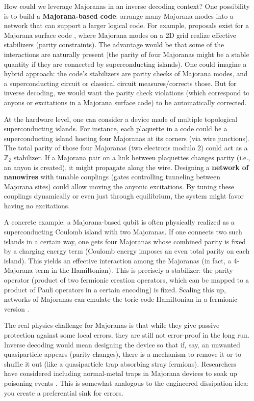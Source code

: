 \documentclass[11pt]{article}
\begin{document}
How could we leverage Majoranas in an inverse decoding context? One possibility is to build a \textbf{Majorana-based code}: arrange many Majorana modes into a network that can support a larger logical code. For example, proposals exist for a Majorana surface code \cite{Terhal2012MajoranaSurf}, where Majorana modes on a 2D grid realize effective stabilizers (parity constraints). The advantage would be that some of the interactions are naturally present (the parity of four Majoranas might be a stable quantity if they are connected by superconducting islands). One could imagine a hybrid approach: the code's stabilizers are parity checks of Majorana modes, and a superconducting circuit or classical circuit measures/corrects those. But for inverse decoding, we would want the parity check violations (which correspond to anyons or excitations in a Majorana surface code) to be automatically corrected.

At the hardware level, one can consider a device made of multiple topological superconducting islands. For instance, each plaquette in a code could be a superconducting island hosting four Majoranas at its corners (via wire junctions). The total parity of those four Majoranas (two electrons modulo 2) could act as a $\mathbb{Z}_2$ stabilizer. If a Majorana pair on a link between plaquettes changes parity (i.e., an anyon is created), it might propagate along the wire. Designing a \textbf{network of nanowires} with tunable couplings (gates controlling tunneling between Majorana sites) could allow moving the anyonic excitations. By tuning these couplings dynamically or even just through equilibrium, the system might favor having no excitations.

A concrete example: a Majorana-based qubit is often physically realized as a superconducting Coulomb island with two Majoranas. If one connects two such islands in a certain way, one gets four Majoranas whose combined parity is fixed by a charging energy term (Coulomb energy imposes an even total parity on each island). This yields an effective interaction among the Majoranas (in fact, a 4-Majorana term in the Hamiltonian). This is precisely a stabilizer: the parity operator (product of two fermionic creation operators, which can be mapped to a product of Pauli operators in a certain encoding) is fixed. Scaling this up, networks of Majoranas can emulate the toric code Hamiltonian in a fermionic version \cite{Vijay2015}. 

The real physics challenge for Majoranas is that while they give passive protection against some local errors, they are still not error-proof in the long run. Inverse decoding would mean designing the device so that if, say, an unwanted quasiparticle appears (parity changes), there is a mechanism to remove it or to shuffle it out (like a quasiparticle trap absorbing stray fermions). Researchers have considered including normal-metal traps in Majorana devices to soak up poisoning events \cite{Karzig2017}. This is somewhat analogous to the engineered dissipation idea: you create a preferential sink for errors.
\end{document}
